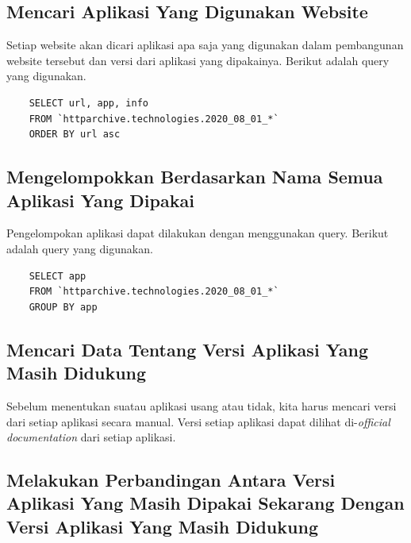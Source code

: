 \subsection{Mencari Aplikasi Yang Digunakan Website}
Setiap website akan dicari aplikasi apa saja yang digunakan dalam pembangunan website tersebut dan versi dari aplikasi yang dipakainya. Berikut adalah query yang digunakan.
\begin{verbatim}
	SELECT url, app, info
	FROM `httparchive.technologies.2020_08_01_*`
	ORDER BY url asc
\end{verbatim}

\subsection{Mengelompokkan Berdasarkan Nama Semua Aplikasi Yang Dipakai}
Pengelompokan aplikasi dapat dilakukan dengan menggunakan query. Berikut adalah query yang digunakan.
\begin{verbatim}
	SELECT app
	FROM `httparchive.technologies.2020_08_01_*`
	GROUP BY app
\end{verbatim}

\subsection{Mencari Data Tentang Versi Aplikasi Yang Masih Didukung}
Sebelum menentukan suatau aplikasi usang atau tidak, kita harus mencari versi dari setiap aplikasi secara manual. Versi setiap aplikasi dapat dilihat di-\textit{official documentation} dari setiap aplikasi. 

\subsection{Melakukan Perbandingan Antara Versi Aplikasi Yang Masih Dipakai Sekarang Dengan Versi Aplikasi Yang Masih Didukung}


\subsection{}

